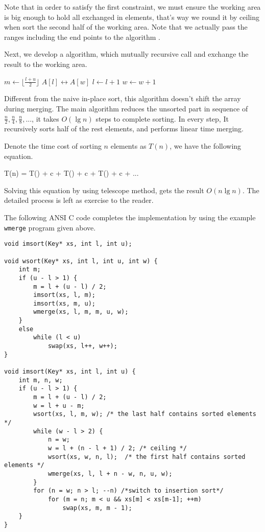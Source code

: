 \documentclass[UTF8]{article}
\begin{document}
Note that in order to satisfy the first constraint, we must ensure the working area is big enough to hold
all exchanged in elements, that's way we round it by ceiling when sort the second half of the working area.
Note that we actually pass the ranges including the end points to the algorithm .

Next, we develop a  algorithm, which mutually recursive call  and exchange the result
to the working area.

\begin{algorithmic}[1]
    \State $m \gets \lfloor \frac{l + u}{2} \rfloor$
    \State {}
    \State {}
    \State {}
  \Else {}
      \State {} $A[l] \leftrightarrow A[w]$
      \State $l \gets l + 1$
      \State $w \gets w + 1$
    \EndWhile
  \EndIf
\EndProcedure
\end{algorithmic}

Different from the naive in-place sort, this algorithm doesn't shift the array during merging. The main
algorithm reduces the unsorted part in sequence of $\frac{n}{2}, \frac{n}{4}, \frac{n}{8}, ...$, it takes $O(\lg n)$ steps to complete
sorting. In every step, It recursively sorts half of the rest elements, and performs linear time merging.

Denote the time cost of sorting $n$ elements as $T(n)$, we have the following equation.

\be
T(n) = T() + c  + T() + c  + T() + c  + ...
\ee

Solving this equation by using telescope method, gets the result $O(n \lg n)$. The detailed process is
left as exercise to the reader.

The following ANSI C code completes the implementation by using the example \verb|wmerge| program given
above.

\lstset{language=C}
\begin{lstlisting}
void imsort(Key* xs, int l, int u);

void wsort(Key* xs, int l, int u, int w) {
    int m;
    if (u - l > 1) {
        m = l + (u - l) / 2;
        imsort(xs, l, m);
        imsort(xs, m, u);
        wmerge(xs, l, m, m, u, w);
    }
    else
        while (l < u)
            swap(xs, l++, w++);
}

void imsort(Key* xs, int l, int u) {
    int m, n, w;
    if (u - l > 1) {
        m = l + (u - l) / 2;
        w = l + u - m;
        wsort(xs, l, m, w); /* the last half contains sorted elements */
        while (w - l > 2) {
            n = w;
            w = l + (n - l + 1) / 2; /* ceiling */
            wsort(xs, w, n, l);  /* the first half contains sorted elements */
            wmerge(xs, l, l + n - w, n, u, w);
        }
        for (n = w; n > l; --n) /*switch to insertion sort*/
            for (m = n; m < u && xs[m] < xs[m-1]; ++m)
                swap(xs, m, m - 1);
    }
}
\end{lstlisting}
\end{document}

